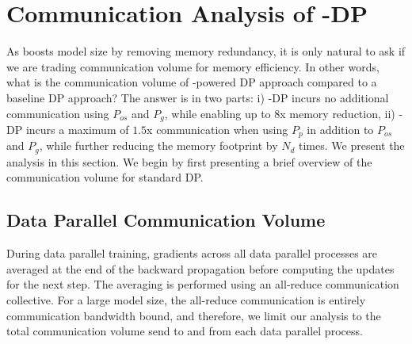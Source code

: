 \section{Communication Analysis of \name-DP}\label{sec:communication}


As \name boosts model size by removing memory redundancy, it is only natural to ask if we are trading communication volume for memory efficiency. In other words, what is the communication volume of \name-powered DP approach compared to a baseline DP approach?
The answer is in two parts: i) \name-DP incurs no additional communication using $P_{os}$ and $P_g$, while enabling up to 8x memory reduction,
ii) \name-DP incurs a maximum of $1.5$x communication when using $P_p$ in addition to $P_{os}$ and $P_{g}$, while further reducing the memory footprint by $N_d$ times.
We present the analysis in this section.  
We begin by first presenting a brief overview of the communication volume for standard DP. 

\subsection{Data Parallel Communication Volume}
During data parallel training, gradients across all data parallel processes are averaged at the end of the backward propagation before computing the updates for the next step. The averaging is performed using an all-reduce communication collective. For a large model size, the all-reduce communication is entirely communication bandwidth bound, and therefore, we limit our analysis to the total communication volume send to and from each data parallel process.

